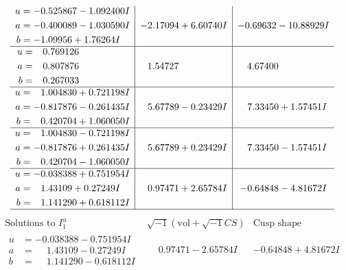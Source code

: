 \documentclass[1p]{elsarticle_modified}
\theoremstyle{definition}
\newcommand{\I}{\sqrt{-1}}
\begin{document}
$$\begin{array}{c|c|c}
\begin{aligned}
u &= -0.525867 - 1.092400 I \\
a &= -0.400089 - 1.030590 I \\
b &= -1.09956 + 1.76264 I\end{aligned}
 & -2.17094 + 6.60740 I & -0.69632 - 10.88929 I \\ \hline\begin{aligned}
u &= \phantom{-}0.769126\phantom{ +0.000000I} \\
a &= \phantom{-}0.807876\phantom{ +0.000000I} \\
b &= \phantom{-}0.267033\phantom{ +0.000000I}\end{aligned}
 & \phantom{-}1.54727\phantom{ +0.000000I} & \phantom{-}4.67400\phantom{ +0.000000I} \\ \hline\begin{aligned}
u &= \phantom{-}1.004830 + 0.721198 I \\
a &= -0.817876 - 0.261435 I \\
b &= \phantom{-}0.420704 + 1.060050 I\end{aligned}
 & \phantom{-}5.67789 - 0.23429 I & \phantom{-}7.33450 + 1.57451 I \\ \hline\begin{aligned}
u &= \phantom{-}1.004830 - 0.721198 I \\
a &= -0.817876 + 0.261435 I \\
b &= \phantom{-}0.420704 - 1.060050 I\end{aligned}
 & \phantom{-}5.67789 + 0.23429 I & \phantom{-}7.33450 - 1.57451 I \\ \hline\begin{aligned}
u &= -0.038388 + 0.751954 I \\
a &= \phantom{-}1.43109 + 0.27249 I \\
b &= \phantom{-}1.141290 + 0.618112 I\end{aligned}
 & \phantom{-}0.97471 + 2.65784 I & -0.64848 - 4.81672 I\\
 \hline 
 \end{array}$$\newpage$$\begin{array}{c|c|c}  
\text{Solutions to }I^u_{1}& \I (\text{vol} + \sqrt{-1}CS) & \text{Cusp shape}\\
 \hline 
\begin{aligned}
u &= -0.038388 - 0.751954 I \\
a &= \phantom{-}1.43109 - 0.27249 I \\
b &= \phantom{-}1.141290 - 0.618112 I\end{aligned}
 & \phantom{-}0.97471 - 2.65784 I & -0.64848 + 4.81672 I \\ \hline\begin{aligned}

\end{aligned}
\end{array}$$
\end{document}
